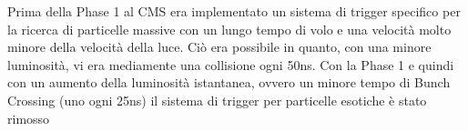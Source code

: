 Prima della Phase 1 al CMS era implementato un sistema di trigger specifico per la ricerca di particelle massive con un lungo tempo di volo e una velocità molto minore della velocità della luce. Ciò era possibile in quanto, con una minore luminosità, vi era mediamente una collisione ogni 50ns. Con la Phase 1 e quindi con un aumento della luminosità istantanea, ovvero un minore tempo di Bunch Crossing (uno ogni 25ns) il sistema di trigger per particelle esotiche è stato rimosso \cite{MasterThesisGioMoc}